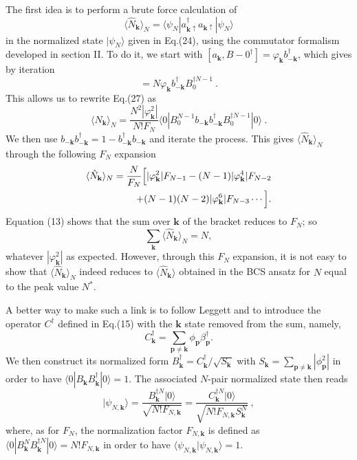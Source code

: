 \documentclass[twocolumn,showpacs]{revtex4}
\def\v#1{\mathbf{#1}}
\begin{document}
The first idea is to perform a brute force calculation of
\begin{equation}
 \langle\hat{N}_{\v{k}}\rangle_{N}=\langle\psi_N|a_{\v k\uparrow}^\dag a_{\v k\uparrow}|\psi_N\rangle
\end{equation}
in the normalized state $|\psi_N\rangle$ given in Eq.(24), using the commutator formalism developed in section II. To do it, we start with $[a_{\v k},B-0^\dag]=\varphi_{\v k}b_{-\v k}^\dag$, which gives by iteration
\begin{equation}
[a_{\v k},B_0^{\dag N}]=N\varphi_{\v k} b_{-\v k}^\dag B_0^{\dag N-1}\ .
\end{equation}
This allows us to rewrite Eq.(27) as
\begin{equation}
 \langle\hat{N}_{\v{k}}\rangle_{N}=\frac{N^2|\varphi_{\v k}^2|}{N!F_N}\langle 0|B_0^{N-1}b_{-\v k}b_{-\v k}^\dag B_0^{\dag N-1}|0\rangle\ .
\end{equation}
We then use $b_{-\v k}b_{-\v k}^\dag=1-b_{-\v k}^\dag b_{-\v k}$ and iterate the process. This gives $ \langle\hat{N}_{\v{k}}\rangle_{N}$ through the following $F_N$ expansion
\begin{eqnarray}
 \langle\hat{N}_{\v{k}}\rangle_{N}=\frac{N}{F_N}\Big{[}|\varphi_{\v k}^2|F_{N-1}-(N-1)|\varphi_{\v k}^4|F_{N-2}
\nonumber\\
+(N-1)(N-2)|\varphi_{\v k}^6|F_{N-3}\cdots\Big{]}.
\end{eqnarray}
Equation (13) shows that the sum over $\v k$ of the bracket reduces to $F_N$; so 
\begin{equation}
\sum_{\v k} \langle\hat{N}_{\v{k}}\rangle_{N}=N,
\end{equation}
whatever $|\varphi_{\v k}^2|$ as expected. However, through this $F_N$ expansion, it is not easy to show that $ \langle\hat{N}_{\v{k}}\rangle_{N}$ indeed reduces to $ \langle\hat{N}_{\v{k}}\rangle$ obtained in the BCS ansatz for $N$ equal to the peak value $N^\ast$.

A better way to make such a link is to follow Leggett \cite{Leggett} and to introduce the operator $C^\dag$ defined in Eq.(15) with the $\v k$ state removed from the sum, namely,
\begin{equation}
C_{\v k}^\dag=\sum_{\v p\neq\v k}\phi_{\v p}\beta_{\v p}^\dag.
\end{equation}
We then construct its normalized form $B_{\v k}^\dag=C_{\v k}^\dag/\sqrt{S_{\v k}}$ with $S_{\v k}=\sum_{\v p\neq\v k}|\phi_{\v p}^2|$ in order to have $\langle 0|B_{\v k}B_{\v k}^\dag|0\rangle=1$. The associated $N$-pair normalized state then reads
\begin{equation}
|\psi_{N,\v k}\rangle=\frac{B_{\v k}^{\dag N}|0\rangle}{\sqrt{N!F_{N,\v k}}}=
\frac{C_{\v k}^{\dag N}|0\rangle}{\sqrt{N!F_{N,\v k}S_{\v k}^N}}\ ,
\end{equation}
where, as for $F_N$, the normalization factor $F_{N,\v k}$ is defined as $\langle 0|B_{\v k}^NB_{\v k}^{\dag N}|0\rangle=N!F_{N,\v k}$ in order to have $\langle\psi_{N,\v k}|\psi_{N,\v k}\rangle=1$.
\end{document}
